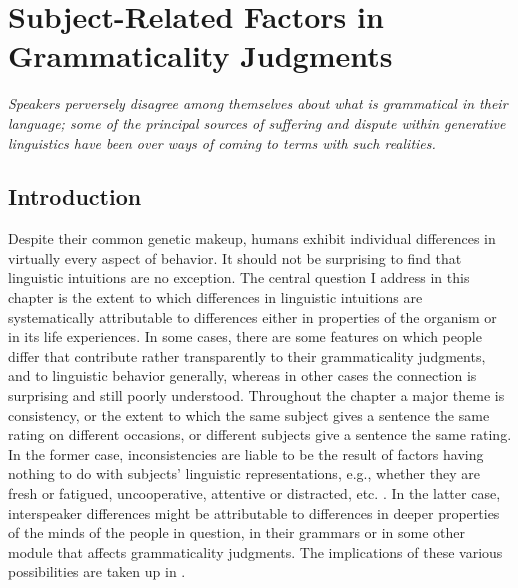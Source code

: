 \chapter{Subject-Related Factors in Grammaticality Judgments}\label{sec:4}

\epigraph{\itshape Speakers perversely  disagree among themselves about what is grammatical in their language; some of the principal  sources of suffering and dispute within generative  linguistics have been over ways of coming to terms with such realities.\\[-2\baselineskip]}{\citep{Fillmore1979}}

\section{Introduction}\label{sec:4.1}

Despite their common genetic makeup, humans exhibit individual differences in virtually every aspect of behavior. It should not be surprising to find that linguistic intuitions are no exception. The central question I address in this chapter is the extent to which differences in linguistic intuitions are systematically attributable to differences either in properties of the organism or in its life experiences. In some cases, there are some features on which people differ that contribute rather transparently to their grammaticality judgments, and to linguistic behavior generally, whereas in other cases the connection is surprising and still poorly understood. Throughout the chapter a major theme is consistency, or the extent to which the same subject gives a sentence the same rating on different occasions, or different subjects give a sentence the same rating. In the former case, inconsistencies are liable to be the result of factors having nothing to do with subjects' linguistic representations, e.g., whether they are fresh or fatigued, uncooperative, attentive or distracted, etc. \citep{BradacEtAl1980}. In the latter case, interspeaker differences might be attributable to differences in deeper properties of the minds of the people in question, in their grammars or in some other module that affects grammaticality judgments. The implications of these various possibilities are taken up in .



